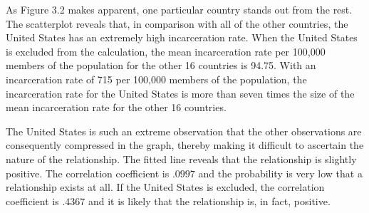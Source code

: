 As Figure 3.2 makes apparent, one particular country stands out from the rest.  The scatterplot reveals that, in comparison with all of the other countries, the United States has an extremely high incarceration rate.  When the United States is excluded from the calculation, the mean incarceration rate per 100,000 members of the population for the other 16 countries is 94.75.  With an incarceration rate of 715 per 100,000 members of the population, the incarceration rate for the United States is more than seven times the size of the mean incarceration rate for the other 16 countries.

The United States is such an extreme observation that the other observations are consequently compressed in the graph, thereby making it difficult to ascertain the nature of the relationship.  The fitted line reveals that the relationship is slightly positive.  The correlation coefficient is $.0997$ and the probability is very low that a relationship exists at all.  If the United States is excluded, the correlation coefficient is $.4367$ and it is likely that the relationship is, in fact, positive.

%


